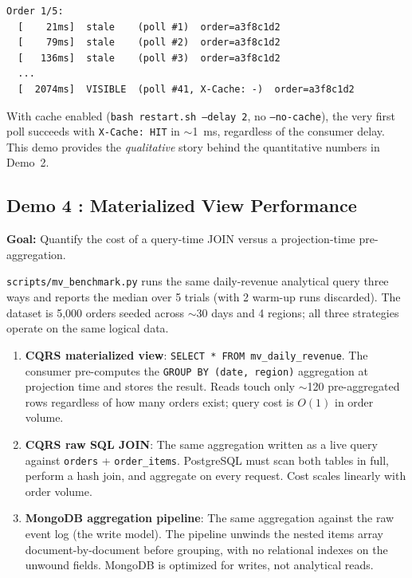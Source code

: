 \documentclass[11pt,a4paper]{article}
\newcommand{\code}[1]{\texttt{\small #1}}
\newcommand{\file}[1]{\textcolor{primary}{\texttt{\small #1}}}
\begin{document}
\begin{lstlisting}[language=none]
Order 1/5:
  [    21ms]  stale    (poll #1)  order=a3f8c1d2
  [    79ms]  stale    (poll #2)  order=a3f8c1d2
  [   136ms]  stale    (poll #3)  order=a3f8c1d2
  ...
  [  2074ms]  VISIBLE  (poll #41, X-Cache: -)  order=a3f8c1d2
\end{lstlisting}

With cache enabled (\code{bash restart.sh --delay 2}, no \code{--no-cache}), the very first poll succeeds with \code{X-Cache: HIT} in $\sim$1~ms, regardless of the consumer delay. This demo provides the \emph{qualitative} story behind the quantitative numbers in Demo~2.

 \subsection{Demo 4 : Materialized View Performance}

\textbf{Goal:} Quantify the cost of a query-time JOIN versus a projection-time pre-aggregation.

\file{scripts/mv\_benchmark.py} runs the same daily-revenue analytical query three ways and reports the median over 5 trials (with 2 warm-up runs discarded). The dataset is 5,000 orders seeded across $\sim$30 days and 4 regions; all three strategies operate on the same logical data.

\begin{enumerate}
\item \textbf{CQRS materialized view}:  \code{SELECT * FROM mv\_daily\_revenue}. The consumer pre-computes the \code{GROUP BY (date, region)} aggregation at projection time and stores the result. Reads touch only $\sim$120 pre-aggregated rows regardless of how many orders exist; query cost is $O(1)$ in order volume.

\item \textbf{CQRS raw SQL JOIN}: The same aggregation written as a live query against \code{orders} + \code{order\_items}. PostgreSQL must scan both tables in full, perform a hash join, and aggregate on every request. Cost scales linearly with order volume.

\item \textbf{MongoDB aggregation pipeline}: The same aggregation against the raw event log (the write model). The pipeline unwinds the nested items array document-by-document before grouping, with no relational indexes on the unwound fields. MongoDB is optimized for writes, not analytical reads.
\end{enumerate}
\end{document}
